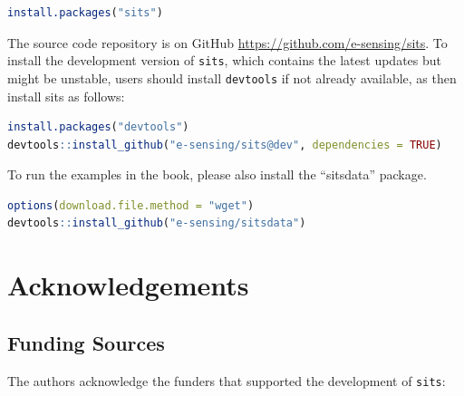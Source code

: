 \documentclass[
  11pt,
]{report}
\newcommand{\passthrough}[1]{#1}
\begin{document}
\begin{lstlisting}[language=R]
install.packages("sits")
\end{lstlisting}

The source code repository is on GitHub
\url{https://github.com/e-sensing/sits}. To install the development
version of \passthrough{\lstinline!sits!}, which contains the latest
updates but might be unstable, users should install
\passthrough{\lstinline!devtools!} if not already available, as then
install sits as follows:

\begin{lstlisting}[language=R]
install.packages("devtools")
devtools::install_github("e-sensing/sits@dev", dependencies = TRUE)
\end{lstlisting}

To run the examples in the book, please also install the ``sitsdata''
package.

\begin{lstlisting}[language=R]
options(download.file.method = "wget")
devtools::install_github("e-sensing/sitsdata")
\end{lstlisting}

\hypertarget{acknowledgements}{%
\chapter*{Acknowledgements}\label{acknowledgements}}

\hypertarget{funding-sources}{%
\section*{Funding Sources}\label{funding-sources}}

The authors acknowledge the funders that supported the development of
\passthrough{\lstinline!sits!}:
\end{document}
